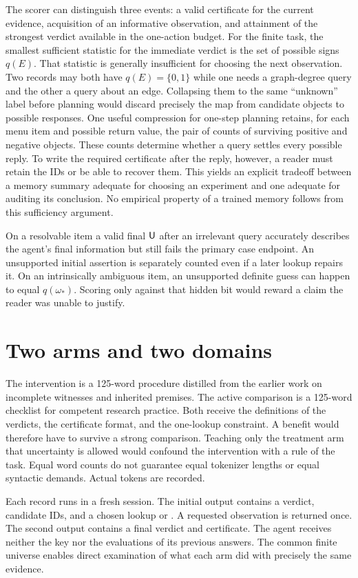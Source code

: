 \documentclass[12pt,letterpaper]{article}
\newcommand{\code}[1]{\texttt{\detokenize{#1}}}
\begin{document}
The scorer can distinguish three events: a valid certificate for the current evidence, acquisition of an informative observation, and attainment of the strongest verdict available in the one-action budget. For the finite task, the smallest sufficient statistic for the immediate verdict is the set of possible signs $q(E)$. That statistic is generally insufficient for choosing the next observation. Two records may both have $q(E)=\{0,1\}$ while one needs a graph-degree query and the other a query about an edge. Collapsing them to the same ``unknown'' label before planning would discard precisely the map from candidate objects to possible responses. One useful compression for one-step planning retains, for each menu item and possible return value, the pair of counts of surviving positive and negative objects. These counts determine whether a query settles every possible reply. To write the required certificate after the reply, however, a reader must retain the IDs or be able to recover them. This yields an explicit tradeoff between a memory summary adequate for choosing an experiment and one adequate for auditing its conclusion. No empirical property of a trained memory follows from this sufficiency argument.

On a resolvable item a valid final $\mathsf U$ after an irrelevant query accurately describes the agent's final information but still fails the primary case endpoint. An unsupported initial assertion is separately counted even if a later lookup repairs it. On an intrinsically ambiguous item, an unsupported definite guess can happen to equal $q(\omega_*)$. Scoring only against that hidden bit would reward a claim the reader was unable to justify.
\section{Two arms and two domains}

The intervention is a 125-word procedure distilled from the earlier work on incomplete witnesses and inherited premises. The active comparison is a 125-word checklist for competent research practice. Both receive the definitions of the verdicts, the certificate format, and the one-lookup constraint. A benefit would therefore have to survive a strong comparison. Teaching only the treatment arm that uncertainty is allowed would confound the intervention with a rule of the task. Equal word counts do not guarantee equal tokenizer lengths or equal syntactic demands. Actual tokens are recorded.

Each record runs in a fresh session. The initial output contains a verdict, candidate IDs, and a chosen lookup or \code{NONE}. A requested observation is returned once. The second output contains a final verdict and certificate. The agent receives neither the key nor the evaluations of its previous answers. The common finite universe enables direct examination of what each arm did with precisely the same evidence.
\end{document}
